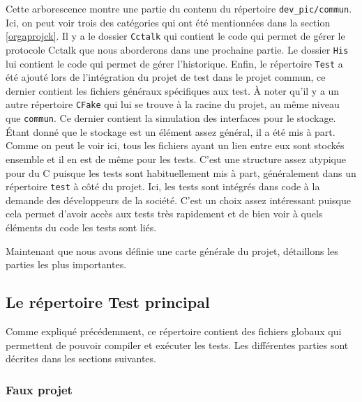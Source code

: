 \documentclass[a4paper]{article}
\begin{document}
Cette arborescence montre une partie du contenu du répertoire
\verb|dev_pic/commun|. Ici, on peut voir trois des catégories qui ont été
mentionnées dans la section \ref{orgaprojck}. Il y a le dossier \verb|Cctalk|
qui contient le code qui permet de gérer le protocole Cctalk que nous aborderons
dans une prochaine partie. Le dossier \verb|His| lui contient le code qui permet
de gérer l'historique. Enfin, le répertoire \verb|Test| a été ajouté lors de
l'intégration du projet de test dans le projet commun, ce dernier contient les
fichiers généraux spécifiques aux test. À noter qu'il y a un autre répertoire
\verb|CFake| qui lui se trouve à la racine du projet, au même niveau que
\verb|commun|. Ce dernier contient la simulation des interfaces pour le
stockage. Étant donné que le stockage est un élément assez général, il a été mis
à part. Comme on peut le voir ici, tous les fichiers ayant un lien entre eux
sont stockés ensemble et il en est de même pour les tests. C'est une structure
assez atypique pour du C puisque les tests sont habituellement mis à part,
généralement dans un répertoire \verb|test| à côté du projet. Ici, les tests
sont intégrés dans code à la demande des développeurs de la société. C'est un
choix assez intéressant puisque cela permet d'avoir accès aux tests très
rapidement et de bien voir à quels éléments du code les tests sont liés.

Maintenant que nous avons définie une carte générale du projet, détaillons les
parties les plus importantes.

\subsection{Le répertoire Test principal}

Comme expliqué précédemment, ce répertoire contient des fichiers globaux
qui permettent de pouvoir compiler et exécuter les tests. Les différentes
parties sont décrites dans les sections suivantes.

\subsubsection*{Faux projet}
\label{fakeproj}
\end{document}
